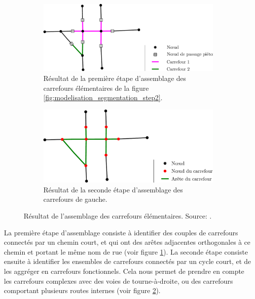 \begin{figure}
    \centering
    \begin{subfigure}[t]{.49\linewidth}
        \includegraphics[width=\textwidth]{images/modelisation/segmentation/segmentation-step3.pdf}
        \caption{Résultat de la première étape d'assemblage des carrefours élémentaires de la figure \ref{fig:modelisation_segmentation_step2}.\label{fig:modelisation_segmentation_step3}}
    \end{subfigure}
    \begin{subfigure}[t]{.49\linewidth}
        \includegraphics[width=\textwidth]{images/modelisation/segmentation/segmentation-step4.pdf}
        \caption{Résultat de la seconde étape d'assemblage des carrefours de gauche.\label{fig:modelisation_segmentation_step4}}
    \end{subfigure}
    \caption{Résultat de l'assemblage des carrefours élémentaires. Source: \cite{Favreau2022}.}
    \label{fig:modelisation_segmentation_step3&4}
\end{figure}

\newpar{}

La première étape d'assemblage consiste à identifier des couples de carrefours connectés par un chemin court, et qui ont des arêtes adjacentes orthogonales à ce chemin et portant le même nom de rue (voir figure \ref{fig:modelisation_segmentation_step3}). La seconde étape consiste ensuite à identifier les ensembles de carrefours connectés par un cycle court, et de les aggréger en carrefours fonctionnels. Cela nous permet de prendre en compte les carrefours complexes avec des voies de tourne-à-droite, ou des carrefours comportant plusieurs routes internes (voir figure \ref{fig:modelisation_segmentation_step4}). 

